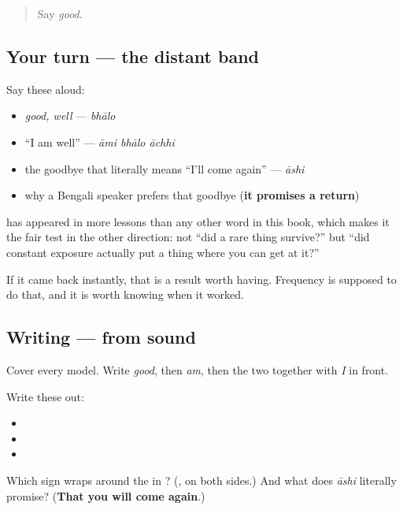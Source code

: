 \label{lesson:BN-R01-bhalo-again}



\begin{quote}
Say \emph{good}.
\end{quote}

\subsection*{Your turn — the distant band}
Say these aloud:

\begin{itemize}
\raggedright
  \item \emph{good, well} — \emph{bhālo}
  \item \textquotedblleft{}I am well\textquotedblright{} — \emph{āmi bhālo āchhi}
  \item the goodbye that literally means \textquotedblleft{}I'll come again\textquotedblright{} — \emph{āshi}
  \item why a Bengali speaker prefers that goodbye (\textbf{it promises a return})
\end{itemize}

\textbf{} has appeared in more lessons than any other word in this book, which makes it the fair test in the other direction: not \textquotedblleft{}did a rare thing survive?\textquotedblright{} but \textquotedblleft{}did constant exposure actually put a thing where you can get at it?\textquotedblright{}

If it came back instantly, that is a result worth having. Frequency is supposed to do that, and it is worth knowing when it worked.

\subsection*{Writing — from sound}
Cover every model. Write \emph{good}, then \emph{am}, then the two together with \emph{I} in front.

Write these out:

\begin{itemize}
\raggedright
  \item {}
  \item {}
  \item {}  
\end{itemize}

\begin{tcolorbox}[breakable,colback=teal!4,colframe=teal!35!black,title={Before you move on}]
Which sign wraps around the \textbf{} in \textbf{}? (\textbf{}, on both sides.) And what does \emph{āshi} literally promise? (\textbf{That you will come again}.)
\end{tcolorbox}
